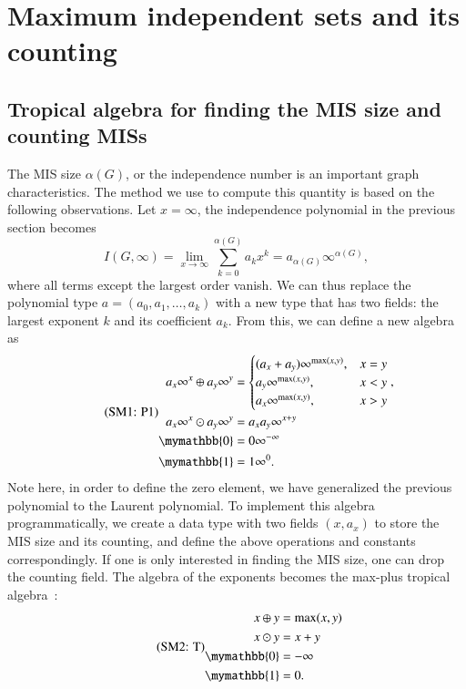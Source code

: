 \documentclass[onefignum, onetabnum]{siamart190516}
\newcommand{\eqname}[1]{\stepcounter{equation}\tag{\theequation : #1}}
\newcommand{\<}{\langle}
\renewcommand{\>}{\rangle}
\begin{document}
\section{Maximum independent sets and its counting}\label{sec:counting}
\subsection{Tropical algebra for finding the MIS size and counting MISs}
The MIS size $\alpha(G)$, or the independence number is an important graph characteristics.
The method we use to compute this quantity is based on the following observations.
Let $x=\infty$, the independence polynomial in the previous section becomes
\begin{equation}
I(G, \infty) = \lim_{x\rightarrow \infty}\sum_{k=0}^{\alpha(G)}a_k x^k = a_{\alpha(G)} \infty^{\alpha(G)},
\end{equation}
where all terms except the largest order vanish. We can thus replace the polynomial type $a = (a_0, a_1, \ldots, a_k)$ with a new type that has two fields: the largest exponent $k$ and its coefficient $a_k$.
From this, we can define a new algebra as
\begin{equation}
    \eqname{P1}
\begin{split}
    a_x\infty^x \oplus a_y\infty^y &= \begin{cases}
        (a_x + a_y)\infty^{\max(x,y)}, & x = y\\
        a_y\infty^{\max(x,y)}, & x < y\\
        a_x\infty^{\max(x,y)}, & x > y
    \end{cases}, \\
    a_x\infty^x \odot a_y\infty^y &= a_x a_y\infty^{x+y}\\
    \mymathbb{0} &= 0\infty^{-\infty}\\
    \mymathbb{1} &= 1\infty^{0}.
\end{split}%
\label{eq:countingtropical}
\end{equation}
Note here, in order to define the zero element, we have generalized the previous polynomial to the Laurent polynomial.
To implement this algebra programmatically, we create a data type with two fields $(x, a_x)$ to store the MIS size and its counting,
and define the above operations and constants correspondingly.
If one is only interested in finding the MIS size, one can drop the counting field.
The algebra of the exponents becomes the max-plus tropical algebra~\cite{Maclagan2015, Moore2011}:
\begin{equation}\eqname{T}
    \begin{split}
        x \oplus y &= \max(x,y)\\
        x \odot y &= x + y\\
        \mymathbb{0} &= -\infty\\
        \mymathbb{1} &= 0.
    \end{split}\label{eq:tropical}
\end{equation}
\end{document}
